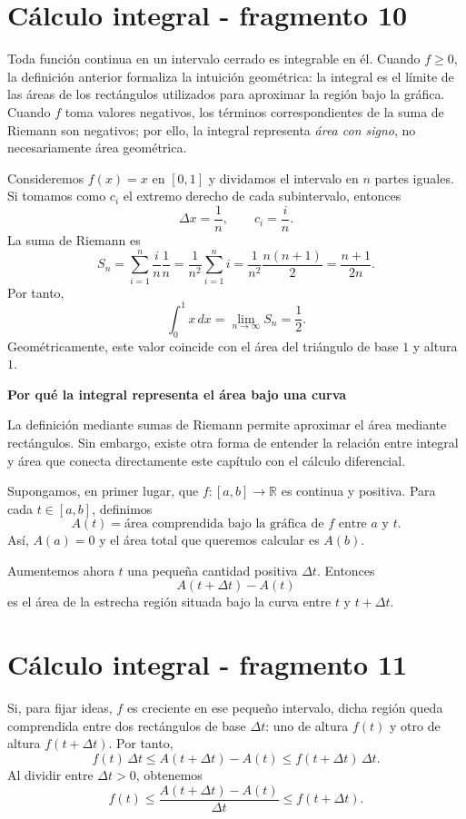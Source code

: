 \section{Cálculo integral - fragmento 10}
Toda función continua en un intervalo cerrado es integrable en él. Cuando $f\geq0$, la definición anterior formaliza la intuición geométrica: la integral es el límite de las áreas de los rectángulos utilizados para aproximar la región bajo la gráfica. Cuando $f$ toma valores negativos, los términos correspondientes de la suma de Riemann son negativos; por ello, la integral representa \emph{área con signo}, no necesariamente área geométrica.

\begin{example}
Consideremos $f(x)=x$ en $[0,1]$ y dividamos el intervalo en $n$ partes iguales. Si tomamos como $c_i$ el extremo derecho de cada subintervalo, entonces
\[
\Delta x=\frac1n,
\qquad
c_i=\frac{i}{n}.
\]
La suma de Riemann es
\[
S_n=\sum_{i=1}^{n}\frac{i}{n}\frac1n
=\frac{1}{n^2}\sum_{i=1}^{n}i
=\frac{1}{n^2}\frac{n(n+1)}{2}
=\frac{n+1}{2n}.
\]
Por tanto,
\[
\int_0^1 x\,dx
=\lim_{n\to\infty}S_n
=\frac12.
\]
Geométricamente, este valor coincide con el área del triángulo de base $1$ y altura $1$.
\end{example}

\textbf{Por qué la integral representa el área bajo una curva}

La definición mediante sumas de Riemann permite aproximar el área mediante rectángulos. Sin embargo, existe otra forma de entender la relación entre integral y área que conecta directamente este capítulo con el cálculo diferencial.

Supongamos, en primer lugar, que $f:[a,b]\to\mathbb{R}$ es continua y positiva. Para cada $t\in[a,b]$, definimos
\[
A(t)=\text{área comprendida bajo la gráfica de $f$ entre $a$ y $t$}.
\]
Así, $A(a)=0$ y el área total que queremos calcular es $A(b)$.

Aumentemos ahora $t$ una pequeña cantidad positiva $\Delta t$. Entonces
\[
A(t+\Delta t)-A(t)
\]
es el área de la estrecha región situada bajo la curva entre $t$ y $t+\Delta t$.


\section{Cálculo integral - fragmento 11}
Si, para fijar ideas, $f$ es creciente en ese pequeño intervalo, dicha región queda comprendida entre dos rectángulos de base $\Delta t$: uno de altura $f(t)$ y otro de altura $f(t+\Delta t)$. Por tanto,
\[
f(t)\,\Delta t
\leq
A(t+\Delta t)-A(t)
\leq
f(t+\Delta t)\,\Delta t.
\]
Al dividir entre $\Delta t>0$, obtenemos
\[
f(t)
\leq
\frac{A(t+\Delta t)-A(t)}{\Delta t}
\leq
f(t+\Delta t).
\]

